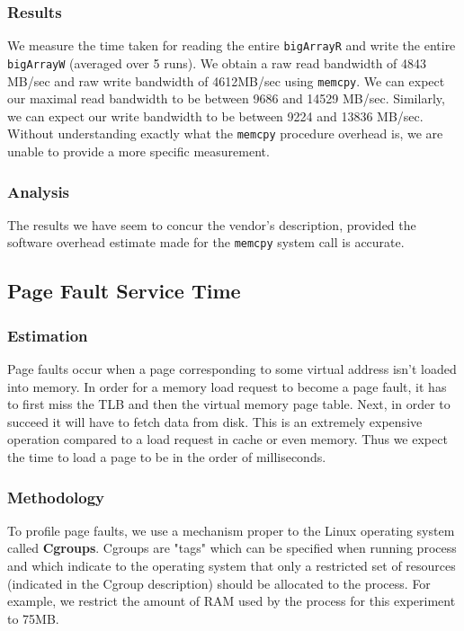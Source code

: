 \subsubsection{Results}


We measure the time taken for reading the entire \texttt{bigArrayR} and write the entire \texttt{bigArrayW} (averaged over 5 runs). 
We obtain a raw read bandwidth of 4843 MB/sec and raw write bandwidth of 4612MB/sec using \texttt{memcpy}. We can expect our maximal read bandwidth to be between 9686 and 14529 MB/sec. Similarly, we can expect our write bandwidth to be between 9224 and 13836 MB/sec. Without understanding exactly what the \texttt{memcpy} procedure overhead is, we are unable to provide a more specific measurement.

\subsubsection{Analysis}

The results we have seem to concur the vendor's description, provided the software overhead estimate made for the \texttt{memcpy} system call is accurate.

\subsection{Page Fault Service Time}

\subsubsection{Estimation}

Page faults occur when a page corresponding to some virtual address isn't loaded into memory. In order for a memory load request to become a page fault, it has to first miss the TLB and then the virtual memory page table. Next, in order to succeed it will have to fetch data from disk. This is an extremely expensive operation compared to a load request in cache or even memory. Thus we expect the time to load a page to be in the order of milliseconds.

\subsubsection{Methodology}

To profile page faults, we use a mechanism proper to the Linux operating system called \textbf{Cgroups}. Cgroups are "tags" which can be specified when running process and which indicate to the operating system that only a restricted set of resources (indicated in the Cgroup description) should be allocated to the process. For example, we restrict the amount of RAM used by the process for this experiment to 75MB.

